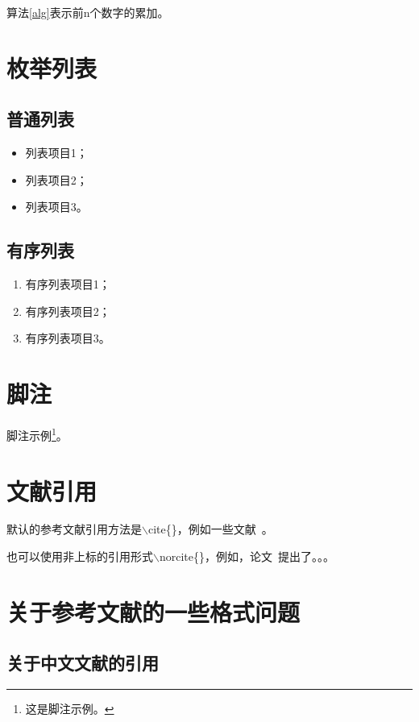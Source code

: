 算法\ref{alg}表示前n个数字的累加。


\section{枚举列表}

\subsection{普通列表}

\begin{itemize}
    \item 列表项目1；
    \item 列表项目2；
    \item 列表项目3。
\end{itemize}

\subsection{有序列表}

\begin{enumerate}
    \item 有序列表项目1；
    \item 有序列表项目2；
    \item 有序列表项目3。
\end{enumerate}


\section{脚注}

脚注示例\footnote{这是脚注示例。}。


\section{文献引用}

默认的参考文献引用方法是$\backslash$cite\{\}，例如一些文献~\cite{kearns1994introduction,shalev2014understanding}。

也可以使用非上标的引用形式$\backslash$norcite\{\}，例如，论文~提出了。。。


\section{关于参考文献的一些格式问题}

\subsection{关于中文文献的引用}

